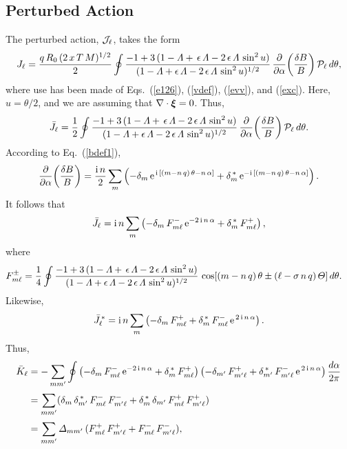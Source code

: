 \documentclass[12pt,prb,aps,notitlepage]{revtex4-1}
\newcommand{\bxi}{\mbox{\boldmath$\xi$}}
\begin{document}
\subsection{Perturbed Action}
The perturbed action, ${\cal J}_\ell$, 
takes the form
\begin{equation}
J_\ell =\frac{q\,R_0\,(2\,x\,T\,M)^{1/2}}{2}\oint
\frac{-1+3\,(1-{\mit\Lambda}+\,\epsilon\,{\mit\Lambda}-2\,\epsilon\,{\mit\Lambda}\,\sin^2 u)}{(1-{\mit\Lambda}+\epsilon\,{\mit\Lambda}-2\,\epsilon\,{\mit\Lambda}\,\sin^2 u)^{1/2}}\,\frac{\partial}{\partial\alpha}\!\left(\frac{\delta B}{B}\right){\cal P}_\ell\,d\theta,
\end{equation}
where use has been made of Eqs.~(\ref{e126}), (\ref{vdef}), (\ref{evv}), and (\ref{exc}). Here, $u=\theta/2$, and we are assuming that $\nabla\cdot\bxi = 0$. 
Thus,
\begin{equation}
\bar{J}_\ell = \frac{1}{2}\oint\frac{-1+3\,(1-{\mit\Lambda}+\,\epsilon\,{\mit\Lambda}-2\,\epsilon\,{\mit\Lambda}\,\sin^2 u)}{(1-{\mit\Lambda}+\epsilon\,{\mit\Lambda}-2\,\epsilon\,{\mit\Lambda}\,\sin^2 u)^{1/2}}\,\frac{\partial}{\partial\alpha}\!\left(\frac{\delta B}{B}\right){\cal P}_\ell\,d\theta.
\end{equation}
According to Eq.~(\ref{bdef1}),
\begin{equation}
\frac{\partial}{\partial\alpha}\!\left(\frac{\delta B}{B}\right)= \frac{{\rm i}\,n}{2}\sum_m\left(
-\delta_m\,{\rm e}^{\,{\rm i}\,[(m-n\,q)\,\theta-n\,\alpha]}+ \delta_m^{\,\ast}\,{\rm e}^{-{\rm i}\,[(m-n\,q)\,\theta-n\,\alpha]} \right).
\end{equation}
It follows that
\begin{equation}
\bar{J}_\ell = {\rm i}\,n\sum_m\left(-\delta_m\,F_{m\ell}^-\,{\rm e}^{-2\,{\rm i}\,n\,\alpha}+\delta_m^{\,\ast}\,F_{m\ell}^+\right),
\end{equation}
where
\begin{align}
F_{m\ell}^\pm &= \frac{1}{4}\oint\frac{-1+3\,(1-{\mit\Lambda}+\,\epsilon\,{\mit\Lambda}-2\,\epsilon\,{\mit\Lambda}\,\sin^2 u)}{(1-{\mit\Lambda}+\epsilon\,{\mit\Lambda}-2\,\epsilon\,{\mit\Lambda}\,\sin^2 u)^{1/2}}\,\cos[(m-n\,q)\,\theta \pm (\ell -\sigma\,n\,q)\,{\mit\Theta}]\,d\theta.
\end{align}
Likewise,
\begin{equation}
\bar{J}_\ell^{\,\ast} = {\rm i}\,n\sum_m\left(-\delta_m\,F^+_{m\ell}+\delta_m^{\,\ast}\,F_{m\ell}^-\,{\rm e}^{\,2\,{\rm i}\,n\,\alpha}\right).
\end{equation}
Thus,
\begin{align}
\bar{K}_\ell &=-\sum_{mm'}\oint\left(-\delta_m\,F_{m\ell}^-\,{\rm e}^{-2\,{\rm i}\,n\,\alpha}+\delta_m^{\,\ast}\,F^+_{m\ell}\right)\left(-\delta_{m'}\,F^+_{m'\ell}+\delta_{m'}^{\,\ast}\,F^-_{m'\ell}\,{\rm e}^{\,2\,{\rm i}\,n\,\alpha}\right)\frac{d\alpha}{2\pi}\nonumber\\[0.5ex]
&=\sum_{mm'}(\delta_m\,\delta_{m'}^{\,\ast}\,F^-_{m\ell}\,F^-_{m'\ell} + \delta_m^{\,\ast}\,\delta_{m'}\,F^+_{m\ell}\,F^+_{m'\ell})\nonumber\\[0.5ex]
&=\sum_{mm'}{\mit\Delta}_{mm'}\,(F^+_{m\ell}\,F^+_{m'\ell} +F^-_{m\ell}\,F^-_{m'\ell}),
\end{align}
\end{document}
